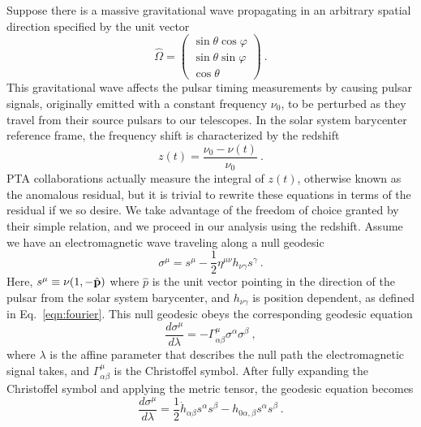 \documentclass[prd,aps,psfig,nofootinbib,nobibnotes,superscriptaddress,preprintnumbers,times]{revtex4-2}\setlength{\topmargin}{-14mm}
\begin{document}
Suppose there is a massive gravitational wave propagating in an arbitrary spatial direction specified by the unit vector
\begin{equation}\label{eqn:omega}
    \hat{\Omega} = \begin{pmatrix}
                        \sin\theta \cos\varphi \\
                        \sin\theta \sin\varphi \\
                        \cos\theta
                    \end{pmatrix} \ .
\end{equation}
This gravitational wave affects the pulsar timing measurements by causing pulsar signals, originally emitted with a constant frequency $\nu_0$, to be perturbed as they travel from their source pulsars to our telescopes. 
In the solar system barycenter reference frame, the frequency shift is characterized by the redshift
\begin{equation}\label{eqn:z}
    z(t) = \frac{\nu_0 - \nu(t)}{\nu_0} \ .
\end{equation}
PTA collaborations actually measure the integral of $z(t)$, otherwise known as the anomalous residual, but it is trivial to rewrite these equations in terms of the residual if we so desire. We take advantage of the freedom of choice granted by their simple relation, and we proceed in our analysis using the redshift. Assume we have an electromagnetic wave traveling along a null geodesic 
\begin{equation}\label{eqn:null}
    \sigma^\mu = s^\mu - \frac{1}{2} \eta^{\mu\nu}h_{\nu \gamma}s^\gamma \ .
\end{equation}
Here, $s^\mu \equiv \nu (1, -\hat{\bf p})$ where $\hat{p}$ is the unit vector pointing in the direction of the pulsar from the solar system barycenter, and $h_{\nu \gamma}$ is position dependent, as defined in Eq.\ \ref{eqn:fourier}. This null geodesic obeys the corresponding geodesic equation 
\begin{equation}\label{eqn:geodesic}
    \frac{d\sigma^\mu}{d\lambda} = -\Gamma_{\alpha \beta}^\mu \sigma^\alpha \sigma^\beta \ ,
\end{equation} where $\lambda$ is the affine parameter that describes the null path the electromagnetic signal takes, and $\Gamma_{\alpha \beta}^\mu$ is the Christoffel symbol. After fully expanding the Christoffel symbol and applying the metric tensor, the geodesic equation becomes  
\begin{equation}\label{eqn:geodesic_further}
    \frac{d\sigma^\mu}{d\lambda} = \frac{1}{2}\dot{h}_{\alpha \beta} s^\alpha s^\beta - h_{0\alpha, \beta} s^\alpha s^\beta \ .
\end{equation}
\end{document}
